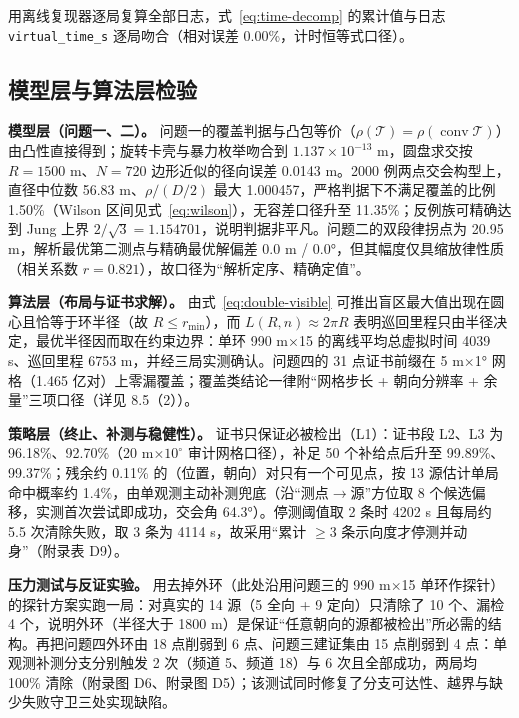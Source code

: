 \documentclass[12pt,a4paper]{ctexart}
\begin{document}
用离线复现器逐局复算全部日志，式~\eqref{eq:time-decomp} 的累计值与日志 \texttt{virtual\_time\_s} 逐局吻合（相对误差 0.00\%，计时恒等式口径）。

\subsection{模型层与算法层检验}

\textbf{模型层（问题一、二）。} 问题一的覆盖判据与凸包等价（$\rho(\mathcal T)=\rho(\operatorname{conv}\mathcal T)$）由凸性直接得到；旋转卡壳与暴力枚举吻合到 $1.137\times10^{-13}$ m，圆盘求交按 $R=1500$ m、$N=720$ 边形近似的径向误差 0.0143 m。2000 例两点交会构型上，直径中位数 56.83 m、$\rho/(D/2)$ 最大 1.000457，严格判据下不满足覆盖的比例 1.50\%（Wilson 区间见式~\eqref{eq:wilson}），无容差口径升至 11.35\%；反例族可精确达到 Jung 上界 $2/\sqrt3=1.154701$，说明判据非平凡。问题二的双段律拐点为 20.95 m，解析最优第二测点与精确最优解偏差 0.0 m / 0.0°，但其幅度仅具缩放律性质（相关系数 $r=0.821$），故口径为“解析定序、精确定值”。

\textbf{算法层（布局与证书求解）。} 由式~\eqref{eq:double-visible} 可推出盲区最大值出现在圆心且恰等于环半径（故 $R\le r_{\min}$），而 $L(R,n)\approx2\pi R$ 表明巡回里程只由半径决定，最优半径因而取在约束边界：单环 990 m$\times$15 的离线平均总虚拟时间 4039 s、巡回里程 6753 m，并经三局实测确认。问题四的 31 点证书前缀在 5 m$\times$1° 网格（1.465 亿对）上零漏覆盖；覆盖类结论一律附“网格步长 + 朝向分辨率 + 余量”三项口径（详见 8.5（2））。

\textbf{策略层（终止、补测与稳健性）。} 证书只保证必被检出（L1）：证书段 L2、L3 为 96.18\%、92.70\%（20 m$\times$$10^\circ$ 审计网格口径），补足 50 个补给点后升至 99.89\%、99.37\%；残余约 0.11\% 的（位置，朝向）对只有一个可见点，按 13 源估计单局命中概率约 1.4\%，由单观测主动补测兜底（沿“测点$\rightarrow$源”方位取 8 个候选偏移，实测首次尝试即成功，交会角 64.3°）。停测阈值取 2 条时 4202 s 且每局约 5.5 次清除失败，取 3 条为 4114 s，故采用“累计 $\ge$3 条示向度才停测并动身”（附录表 D9）。

\textbf{压力测试与反证实验。} 用去掉外环（此处沿用问题三的 990 m$\times$15 单环作探针）的探针方案实跑一局：对真实的 14 源（5 全向 + 9 定向）只清除了 10 个、漏检 4 个，说明外环（半径大于 1800 m）是保证“任意朝向的源都被检出”所必需的结构。再把问题四外环由 18 点削弱到 6 点、问题三建证集由 15 点削弱到 4 点：单观测补测分支分别触发 2 次（频道 5、频道 18）与 6 次且全部成功，两局均 100\% 清除（附录图 D6、附录图 D5）；该测试同时修复了分支可达性、越界与缺少失败守卫三处实现缺陷。
\end{document}
